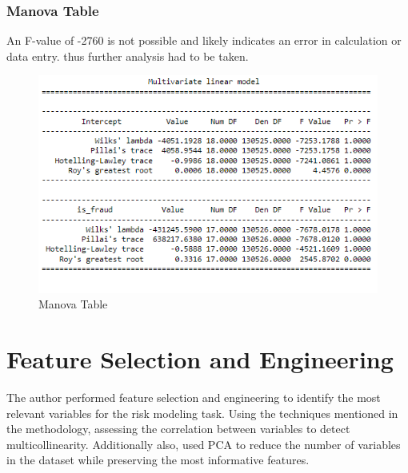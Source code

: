 \subsubsection{Manova Table}
An F-value of -2760 is not possible and likely indicates an error in calculation or data entry.
thus further analysis had to be taken.\\
\begin{figure}[h]
    \centering
    \includegraphics[width=1\linewidth]{image9}
    \caption{Manova Table}
    \label{fig:example}
\end{figure}

\section{Feature Selection and Engineering}

The author performed feature selection and engineering to identify the most relevant variables for the risk modeling 
task. Using the techniques mentioned in the methodology, assessing the correlation between variables to detect 
multicollinearity. Additionally also, used PCA to reduce the number of variables in the 
dataset while preserving the most informative features.

